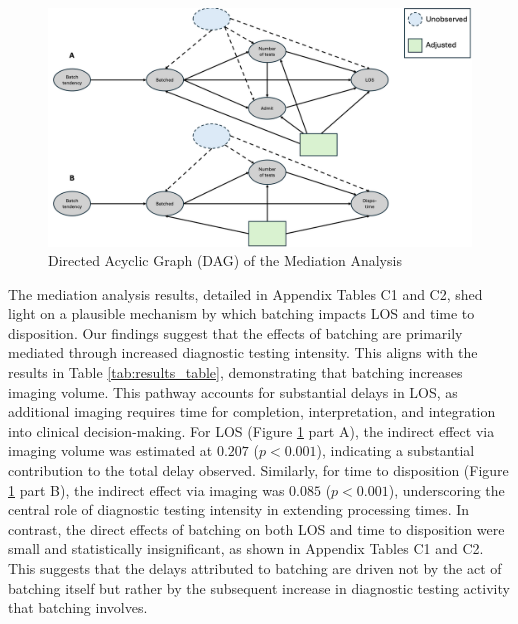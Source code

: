 \documentclass[,,nonblindrev]{informs}
\begin{document}
\begin{figure}[t]
\centering
\includegraphics[width=\textwidth]{figures/dag.png}
\caption{Directed Acyclic Graph (DAG) of the Mediation Analysis}
\label{fig:dag}
\end{figure}

The mediation analysis results, detailed in Appendix Tables C1 and C2,
shed light on a plausible mechanism by which batching impacts LOS and
time to disposition. Our findings suggest that the effects of batching
are primarily mediated through increased diagnostic testing intensity.
This aligns with the results in Table \ref{tab:results_table},
demonstrating that batching increases imaging volume. This pathway
accounts for substantial delays in LOS, as additional imaging requires
time for completion, interpretation, and integration into clinical
decision-making. For LOS (Figure \ref{fig:dag} part A), the indirect
effect via imaging volume was estimated at \(0.207\) (\(p < 0.001\)),
indicating a substantial contribution to the total delay observed.
Similarly, for time to disposition (Figure \ref{fig:dag} part B), the
indirect effect via imaging was \(0.085\) (\(p < 0.001\)), underscoring
the central role of diagnostic testing intensity in extending processing
times. In contrast, the direct effects of batching on both LOS and time
to disposition were small and statistically insignificant, as shown in
Appendix Tables C1 and C2. This suggests that the delays attributed to
batching are driven not by the act of batching itself but rather by the
subsequent increase in diagnostic testing activity that batching
involves.
\end{document}
